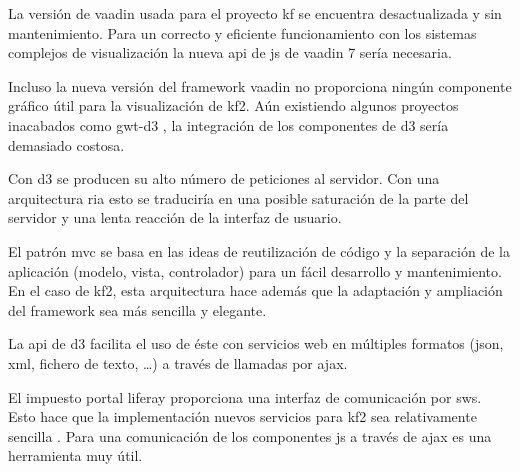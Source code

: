 \begin{itemize}
    La versión de \gls{vaadin} usada para el proyecto \gls{kf} se encuentra desactualizada y sin mantenimiento. Para un correcto y eficiente funcionamiento con los sistemas complejos de visualización la nueva \gls{api} de \gls{js} de \gls{vaadin} 7 sería necesaria.

    Incluso la nueva versión del \gls{framework} \gls{vaadin} no proporciona ningún componente gráfico útil para la visualización de \gls{kf2}. Aún existiendo algunos proyectos inacabados como gwt-d3 \cite{gwtd3}, la integración de los componentes de \gls{d3} sería demasiado costosa.
    
    Con \gls{d3} se producen su alto número de peticiones al servidor. Con una arquitectura \gls{ria} esto se traduciría en una posible saturación de la parte del servidor y una lenta reacción de la interfaz de usuario.
    
    El patrón \gls{mvc} se basa en las ideas de reutilización de código y la separación de la aplicación (modelo, vista, controlador) para un fácil desarrollo y mantenimiento. En el caso de \gls{kf2}, esta arquitectura hace además que la adaptación y ampliación del \gls{framework} sea más sencilla y elegante.
    
    La \gls{api} de \gls{d3} facilita el uso de éste con servicios web en múltiples formatos (\gls{json}, \gls{xml}, fichero de texto, \dots) a través de llamadas por \gls{ajax}.
    
    El impuesto portal \gls{liferay} proporciona una interfaz de comunicación por \glspl{sw}. Esto hace que la implementación nuevos servicios para \gls{kf2} sea relativamente sencilla \cite{liferayws}. Para una comunicación de los componentes  \gls{js} a través de \gls{ajax} es una herramienta muy útil.
\end{itemize}
























